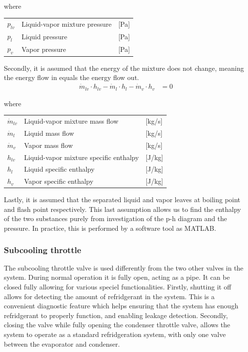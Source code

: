 where

\begin{center}
	\begin{tabular}{l p{8cm} l}
		$p_{lv}$				&  Liquid-vapor mixture pressure		& [\si{Pa}]\\
		$p_{l}$					&  Liquid pressure 						& [\si{Pa}] \\
		$p_{v}$					&  Vapor pressure						& [\si{Pa}]\\

	\end{tabular}
\end{center}


Secondly, it is assumed that the energy of the mixture does not change, meaning the energy flow in equals the energy flow out.
\begin{align}
	\dot{m}_{lv} \cdot  h_{lv}  - \dot{m}_{l} \cdot  h_{l} - \dot{m}_{v} \cdot  h_{v} & = 0
	\label{eq:Flash_tank_energyflow}
\end{align}

where

\begin{center}
	\begin{tabular}{l p{8cm} l}
		$\dot{m}_{lv}$			&  Liquid-vapor mixture mass flow			& [\si{kg}/\si{s}]\\
		$\dot{m}_{l}$			&  Liquid mass flow 						& [\si{kg}/\si{s}] \\
		$\dot{m}_{v}$			&  Vapor mass flow							& [\si{kg}/\si{s}]\\
		$h_{lv}$				&  Liquid-vapor mixture specific enthalpy	& [\si{J}/\si{kg}]\\
		$h_{l}$					&  Liquid specific enthalpy 				& [\si{J}/\si{kg}] \\
		$h_{v}$					&  Vapor specific enthalpy					& [\si{J}/\si{kg}]\\

	\end{tabular}
\end{center}


Lastly, it is assumed that the separated liquid and vapor leaves at boiling point and flash point respectively. This last assumption allows us to find the enthalpy of the two substances purely from investigation of the p-h diagram and the pressure. In practice, this is performed by a software tool as MATLAB.

\subsubsection{Subcooling throttle}
The subcooling throttle valve is used differently from the two other valves in the system. During normal operation it is fully open, acting as a pipe. It can be closed fully allowing for various speciel functionalities. Firstly, shutting it off allows for detecting the amount of refridgerant in the system. This is a convenient diagnostic feature which helps ensuring that the system has enough refridgerant to properly function, and enabling leakage detection. Secondly, closing the valve while fully opening the condenser throttle valve, allows the system to operate as a standard refridgeration system, with only one valve between the evaporator and condenser.


